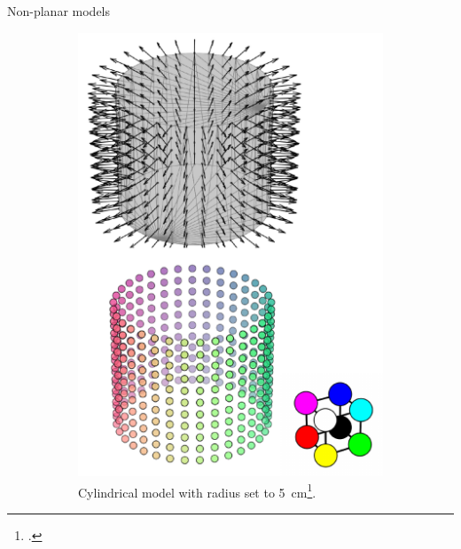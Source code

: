 \documentclass[xcolor=dvipsnames,10pt]{beamer}
\begin{document}
\begin{frame}{Non-planar models}
\begin{figure}
\begin{subfigure}[b]{0.3\textwidth}
         \includegraphics[width=\textwidth]{figures/canonical_tissue_models.cylinder.pdf}
         \caption{Cylindrical model with radius set to \SI{5}{\cm}\footcite{Kapetanovic2023}.}
     \end{subfigure}
     \hfill
     \begin{subfigure}[b]{0.3\textwidth}
         \centering

\end{subfigure}
\end{figure}
\end{frame}
\end{document}

